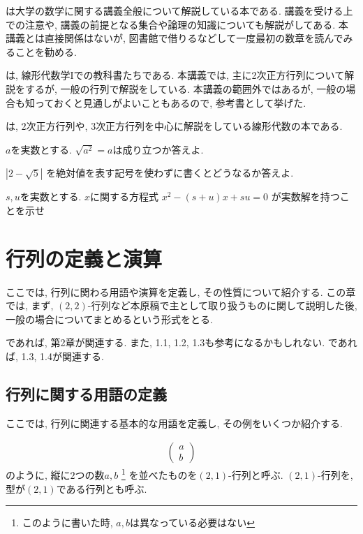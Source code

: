 \cite{978-4-535-78682-0}は大学の数学に関する講義全般について解説している本である.
講義を受ける上での注意や,
講義の前提となる集合や論理の知識についても解説がしてある.
本講義とは直接関係はないが,
図書館で借りるなどして一度最初の数章を読んでみることを勧める.

\cite{978-4-7806-0772-7,978-4-7806-0164-0}
は, 線形代数学Iでの教科書たちである.
本講義では, 主に2次正方行列について解説をするが,
一般の行列で解説をしている.
本講義の範囲外ではあるが,
一般の場合も知っておくと見通しがよいこともあるので,
参考書として挙げた.


\cite{978-4-320-01873-0,978-4-7853-1566-5}は,
$2$次正方行列や, $3$次正方行列を中心に解説をしている線形代数の本である.

\begin{quiz}
  $a$を実数とする.
  $\sqrt{a^2}=a$は成り立つか答えよ.
\end{quiz}

\begin{quiz}
$|2-\sqrt{5}|$
を絶対値を表す記号を使わずに書くとどうなるか答えよ.
\end{quiz}

\begin{quiz}
    $s,u$を実数とする.
    $x$に関する方程式
    $x^2-(s+u)x+su=0$
    が実数解を持つことを示せ
\end{quiz}

\tableofcontents
\chapter{行列の定義と演算}
\label{chap:mat}
ここでは,
行列に関わる用語や演算を定義し,
その性質について紹介する.
この章では,
まず,
$(2,2)$-行列など本原稿で主として取り扱うものに関して説明した後,
一般の場合についてまとめるという形式をとる.


\cite{978-4-7806-0772-7}であれば,
第2章が関連する.
また, 1.1, 1.2, 1.3も参考になるかもしれない.
\cite{978-4-7806-0164-0}であれば,
1.3, 1.4が関連する.

\section{行列に関する用語の定義}
\label{sec:def:mat}
ここでは, 行列に関連する基本的な用語を定義し,
その例をいくつか紹介する.

  \begin{align*}
    \begin{pmatrix}
      a\\b
    \end{pmatrix}
  \end{align*}
  のように, 
  縦に$2$つの数$a,b$%
\footnote{このように書いた時, $a,b$は異なっている必要はない}
  を並べたものを$(2,1)$-行列と呼ぶ.
  $(2,1)$-行列を,
  型が$(2,1)$である行列とも呼ぶ.

